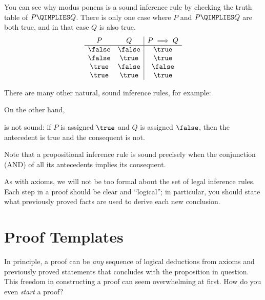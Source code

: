 You can see why modus ponens is a sound inference rule by checking the
truth table of $P\QIMPLIES Q$.  There is only one case where $P$ and
$P \QIMPLIES Q$ are both true, and in that case $Q$ is also true.
\[
\begin{array}{cc|c}
P & Q & P \implies Q \\ \hline
\false & \false & \true \\
\false & \true  & \true \\
\true  & \false & \false \\
\true  & \true  & \true \\
\end{array}
\]

There are many other natural, sound inference rules, for example:
\begin{rul*}
\end{rul*}

\begin{editingnotes}

\begin{rul*}
\end{rul*}

\end{editingnotes}

\begin{rul*}
\end{rul*}

On the other hand,
\begin{rul*}
\end{rul*}
\noindent is not sound: if $P$ is assigned $\true$ and $Q$ is assigned
$\false$, then the antecedent is true and the consequent is not.

Note that a propositional inference rule is sound precisely when the conjunction
(AND) of all its antecedents implies its consequent.

As with axioms, we will not be too formal about the set of legal inference
rules.  Each step in a proof should be clear and ``logical''; in
particular, you should state what previously proved facts are used to
derive each new conclusion.

\section{Proof Templates}

In principle, a proof can be \textit{any} sequence of logical
deductions from axioms and previously proved statements that concludes
with the proposition in question.  This freedom in constructing a
proof can seem overwhelming at first.  How do you even \textit{start}
a proof?

